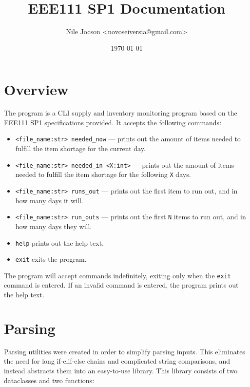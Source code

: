 \documentclass{article}
\title{EEE111 SP1 Documentation}
\author{Nile Jocson \textless{novoseiversia@gmail.com}\textgreater}
\date{\today}
\begin{document}
	\maketitle
		\pagebreak



	\tableofcontents
		\pagebreak



	\section{Overview}\label{overview}
		The program is a CLI supply and inventory monitoring program based on
		the EEE111 SP1 specifications provided. It accepts the following commands:

		\begin{itemize}
			\item \verb|<file_name:str> needed_now| --- prints out the amount of items
			needed to fulfill the item shortage for the current day.
			\item \verb|<file_name:str> needed_in <X:int>| --- prints out the amount of items
			needed to fulfill the item shortage for the following \verb|X| days.
			\item \verb|<file_name:str> runs_out| --- prints out the first item to run out, and
			in how many days it will.
			\item \verb|<file_name:str> run_outs| --- prints out the first \verb|N| items to run
			out, and in how many days they will.
			\item \verb|help| prints out the help text.
			\item \verb|exit| exits the program.
		\end{itemize}

		The program will accept commands indefinitely, exiting only when the \verb|exit| command is
		entered. If an invalid command is entered, the program prints out the help text.

		\pagebreak



	\section{Parsing}
		Parsing utilities were created in order to simplify parsing inputs. This eliminates the
		need for long if-elif-else chains and complicated string comparisons, and instead
		abstracts them into an easy-to-use library. This library consists of two dataclasses and
		two functions:
\end{document}
